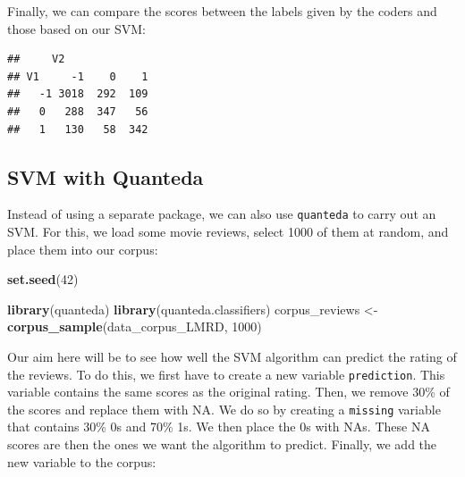 \documentclass[
]{book}
\newenvironment{Shaded}{\begin{snugshade}}{\end{snugshade}}
\newcommand{\DecValTok}[1]{\textcolor[rgb]{0.00,0.00,0.81}{#1}}
\newcommand{\FunctionTok}[1]{\textcolor[rgb]{0.13,0.29,0.53}{\textbf{#1}}}
\newcommand{\NormalTok}[1]{#1}
\newcommand{\OtherTok}[1]{\textcolor[rgb]{0.56,0.35,0.01}{#1}}
\newcommand{\SpecialCharTok}[1]{\textcolor[rgb]{0.81,0.36,0.00}{\textbf{#1}}}
\begin{document}
Finally, we can compare the scores between the labels given by the coders and those based on our SVM:

\begin{Shaded}
\end{Shaded}

\begin{verbatim}
##     V2
## V1     -1    0    1
##   -1 3018  292  109
##   0   288  347   56
##   1   130   58  342
\end{verbatim}

\subsection{SVM with Quanteda}\label{svm-with-quanteda}

Instead of using a separate package, we can also use \texttt{quanteda} to carry out an SVM. For this, we load some movie reviews, select 1000 of them at random, and place them into our corpus:

\begin{Shaded}
\begin{Highlighting}[]
\FunctionTok{set.seed}\NormalTok{(}\DecValTok{42}\NormalTok{)}

\FunctionTok{library}\NormalTok{(quanteda)}
\FunctionTok{library}\NormalTok{(quanteda.classifiers)}
\NormalTok{corpus\_reviews }\OtherTok{\textless{}{-}} \FunctionTok{corpus\_sample}\NormalTok{(data\_corpus\_LMRD, }\DecValTok{1000}\NormalTok{)}
\end{Highlighting}
\end{Shaded}

Our aim here will be to see how well the SVM algorithm can predict the rating of the reviews. To do this, we first have to create a new variable \texttt{prediction}. This variable contains the same scores as the original rating. Then, we remove 30\% of the scores and replace them with NA. We do so by creating a \texttt{missing} variable that contains 30\% 0s and 70\% 1s. We then place the 0s with NAs. These NA scores are then the ones we want the algorithm to predict. Finally, we add the new variable to the corpus:
\end{document}
